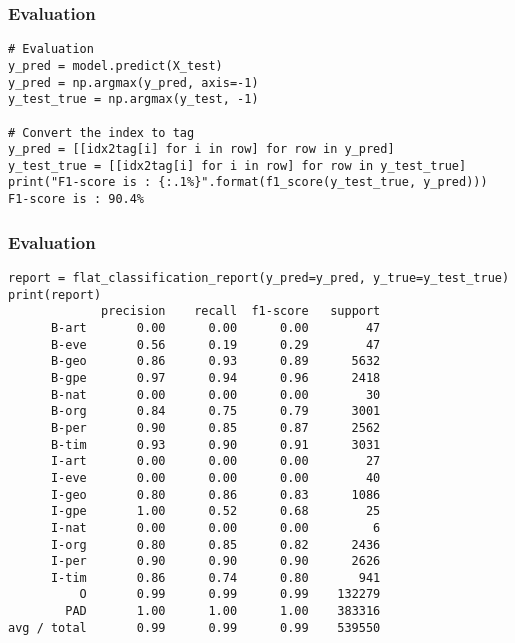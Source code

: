 \begin{frame}[fragile]\frametitle{Evaluation}

\begin{lstlisting}
# Evaluation
y_pred = model.predict(X_test)
y_pred = np.argmax(y_pred, axis=-1)
y_test_true = np.argmax(y_test, -1)

# Convert the index to tag
y_pred = [[idx2tag[i] for i in row] for row in y_pred]
y_test_true = [[idx2tag[i] for i in row] for row in y_test_true]
print("F1-score is : {:.1%}".format(f1_score(y_test_true, y_pred)))
F1-score is : 90.4%

\end{lstlisting}


\end{frame}

\begin{frame}[fragile]\frametitle{Evaluation}

\begin{lstlisting}
report = flat_classification_report(y_pred=y_pred, y_true=y_test_true)
print(report)
             precision    recall  f1-score   support
      B-art       0.00      0.00      0.00        47
      B-eve       0.56      0.19      0.29        47
      B-geo       0.86      0.93      0.89      5632
      B-gpe       0.97      0.94      0.96      2418
      B-nat       0.00      0.00      0.00        30
      B-org       0.84      0.75      0.79      3001
      B-per       0.90      0.85      0.87      2562
      B-tim       0.93      0.90      0.91      3031
      I-art       0.00      0.00      0.00        27
      I-eve       0.00      0.00      0.00        40
      I-geo       0.80      0.86      0.83      1086
      I-gpe       1.00      0.52      0.68        25
      I-nat       0.00      0.00      0.00         6
      I-org       0.80      0.85      0.82      2436
      I-per       0.90      0.90      0.90      2626
      I-tim       0.86      0.74      0.80       941
          O       0.99      0.99      0.99    132279
        PAD       1.00      1.00      1.00    383316
avg / total       0.99      0.99      0.99    539550
\end{lstlisting}
\end{frame}

